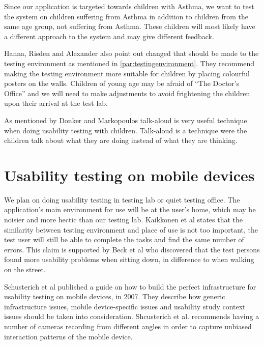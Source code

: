 Since our application is targeted towards children with Asthma, we want to test the system on children suffering from Asthma in addition to children from the same age group, not suffering from Asthma. These children will most likely have a different approach to the system and may give different feedback.

Hanna, Risden and Alexander also point out changed that should be made to the testing environment as mentioned in \ref{par:testingenvironment}. They recommend making the testing environment more suitable for children by placing colourful posters on the walls.
Children of young age may be afraid of ``The Doctor's Office'' and we will need to make adjustments to avoid frightening the children upon their arrival at the test lab. 

As mentioned by Donker and Markopoulos \cite{TalkAloud} talk-aloud is very useful technique when doing usability testing with children. Talk-aloud is a technique were the children talk about what they are doing instead of what they are thinking.


\section{Usability testing on mobile devices}
\label{sec:usabilitytestonmobiledevices}
We plan on doing usability testing in testing lab or quiet testing office. The application's main environment for use will be at the user's home, which may be noisier and more hectic than our testing lab. Kaikkonen et al \cite{kallio2005usability} states that the similarity between testing environment and place of use is not too important, the test user will still be able to complete the tasks and find the same number of errors. This claim is supported by Beck et al \cite{beck2003experimental} who discovered that the test persons found more usability problems when sitting down, in difference to when walking on the street. 

Schusterich et al \cite{schusteritsch2007towards} published a guide on how to build the perfect infrastructure for usability testing on mobile devices, in 2007. They describe how generic infrastructure issues, mobile device-specific issues and usability study context issues should be taken into consideration. Shcusterich et al. recommends having a number of cameras recording from different angles in order to capture unbiased interaction patterns of the mobile device. 

